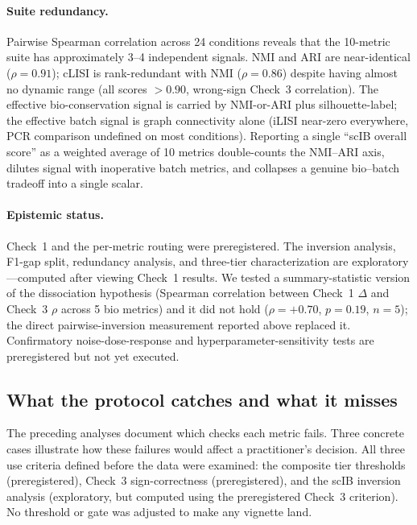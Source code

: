 \documentclass[9pt,lineno]{elife}
\begin{document}
\paragraph{Suite redundancy.} Pairwise Spearman correlation across 24 conditions reveals that the 10-metric suite has approximately 3--4 independent signals. NMI and ARI are near-identical ($\rho = 0.91$); cLISI is rank-redundant with NMI ($\rho = 0.86$) despite having almost no dynamic range (all scores $> 0.90$, wrong-sign Check~3 correlation). The effective bio-conservation signal is carried by NMI-or-ARI plus silhouette-label; the effective batch signal is graph connectivity alone (iLISI near-zero everywhere, PCR comparison undefined on most conditions). Reporting a single ``scIB overall score'' as a weighted average of 10 metrics double-counts the NMI--ARI axis, dilutes signal with inoperative batch metrics, and collapses a genuine bio--batch tradeoff into a single scalar.

\paragraph{Epistemic status.} Check~1 and the per-metric routing were preregistered. The inversion analysis, F1-gap split, redundancy analysis, and three-tier characterization are exploratory---computed after viewing Check~1 results. We tested a summary-statistic version of the dissociation hypothesis (Spearman correlation between Check~1 $\Delta$ and Check~3 $\rho$ across 5 bio metrics) and it did not hold ($\rho = +0.70$, $p = 0.19$, $n = 5$); the direct pairwise-inversion measurement reported above replaced it. Confirmatory noise-dose-response and hyperparameter-sensitivity tests are preregistered but not yet executed.


\subsection{What the protocol catches and what it misses}

The preceding analyses document which checks each metric fails. Three concrete cases illustrate how these failures would affect a practitioner's decision. All three use criteria defined before the data were examined: the composite tier thresholds (preregistered), Check~3 sign-correctness (preregistered), and the scIB inversion analysis (exploratory, but computed using the preregistered Check~3 criterion). No threshold or gate was adjusted to make any vignette land.
\end{document}
